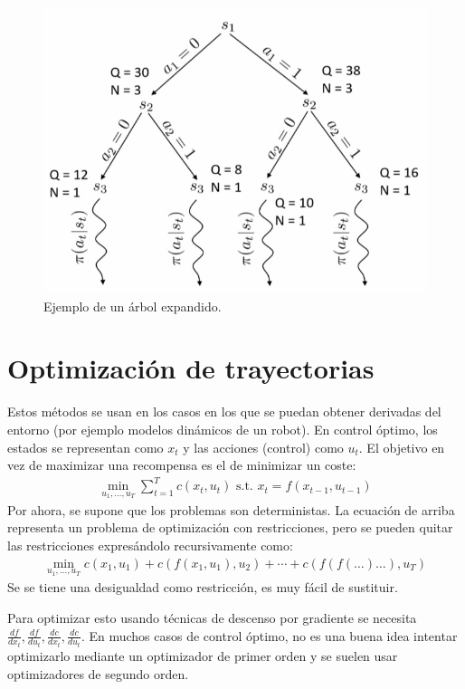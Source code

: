 \begin{figure}[H]
	\centering
	\includegraphics[width=0.5\linewidth]{figures/2020-06-18-154825_656x489_scrot.png}
	\caption{Ejemplo de un árbol expandido.}
\end{figure}

\section{Optimización de trayectorias}%
\label{sec:optimización_de_trayectorias}

Estos métodos se usan en los casos en los que se puedan obtener derivadas del entorno (por
ejemplo modelos dinámicos de un robot). En control óptimo, los estados se representan como
$x_t$ y las acciones (control) como  $u_t$. El objetivo en vez de maximizar una recompensa es el
de minimizar un coste:
\begin{align}
\operatorname { min } _ { u _ { 1 } , \ldots , u _ { T } } \sum _ { t = 1 } ^ { T } c ( x _ { t } , u _ { t } ) \text { s.t. } x _ { t } = f ( x _ { t - 1 } , u _ { t - 1 } )
\end{align}
Por ahora, se supone que los problemas son deterministas. La ecuación de arriba representa un
problema de optimización con restricciones, pero se pueden quitar las restricciones
expresándolo recursivamente como:
\begin{align}
    \label{eq:shootingmethod}
\operatorname { min } _ { u _ { 1 } , \ldots , u _ { T } } c ( x _ { 1 } , u _ { 1 } ) + c ( f ( x _ { 1 } , u _ { 1 } ) , u _ { 2 } ) + \cdots + c ( f ( f ( \ldots ) \ldots ) , u _ { T } )
\end{align}
Se se tiene una desigualdad como restricción, es muy fácil de sustituir.


Para optimizar esto usando técnicas de descenso por gradiente se necesita $\frac { d f } { d x _
{ t } } , \frac { d f } { d u _ { t } } , \frac { d c } { d x _ { t } } , \frac { d c } { d u _ {
t } }$. En muchos casos de control óptimo, no es una buena idea intentar optimizarlo mediante
un optimizador de primer orden y se suelen usar optimizadores de segundo orden.

